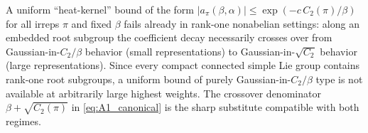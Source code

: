 \begin{remark}
\label{rem:no_go_heatkernel_generic}
A uniform ``heat-kernel'' bound of the form
$|a_{\pi}(\beta,\alpha)|\le \exp(-c\,C_2(\pi)/\beta)$ for all irreps $\pi$ and fixed $\beta$
fails already in rank-one nonabelian settings: along an embedded root subgroup the coefficient decay necessarily crosses over from
Gaussian-in-$C_2/\beta$ behavior (small representations) to Gaussian-in-$\sqrt{C_2}$ behavior (large representations).
Since every compact connected simple Lie group contains rank-one root subgroups,
a uniform bound of purely Gaussian-in-$C_2/\beta$ type is not available at arbitrarily large highest weights.
The crossover denominator $\beta+\sqrt{C_2(\pi)}$ in \eqref{eq:A1_canonical} is the sharp substitute compatible with both regimes.
\end{remark}

